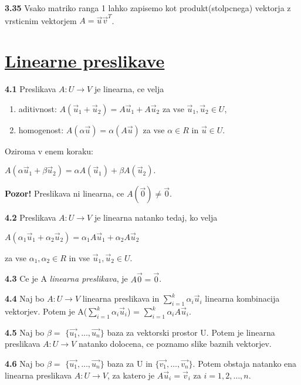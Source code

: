 \documentclass{article}
\begin{document}
\begin{multicols}{2}
	\textbf{3.35} Vsako matriko ranga 1 lahko zapisemo kot produkt(stolpcnega) vektorja z vrsticnim
	vektorjem $A = \vec{u}\vec{v}^{T}$.

	\section{\underline{Linearne preslikave}}

	\textbf{4.1} Preslikava $A: U \rightarrow V$ je linearna, ce velja
	\begin{enumerate}
		\item aditivnost: $A(\vec{u}_{1} + \vec{u}_{2}) = A\vec{u}_{1} + A\vec{u}_{2}$ za vse $\vec{u}_{1}, \vec{u}_{2} \in U$,
		\item homogenost: $A(\alpha \vec{u}) = \alpha(A\vec{u})$ za vse $\alpha \in R$ in $\vec{u} \in U$.
	\end{enumerate}
	Oziroma v enem koraku:
	\begin{center}
		\begin{math}
			A(\alpha\vec{u}_{1} + \beta\vec{u}_{2}) = \alpha A(\vec{u}_{1}) + \beta A(\vec{u}_{2}).
		\end{math}
	\end{center}
	\textbf{Pozor!} Preslikava ni linearna, ce $A(\vec{0}) \neq  \vec{0}$.

	\textbf{4.2} Preslikava $A: U \rightarrow V$ je linearna natanko tedaj, ko velja
	\begin{center}
		$A(\alpha_{1}\vec{u}_{1} + \alpha_{2}\vec{u}_{2}) = \alpha_{1}A\vec{u}_{1} + \alpha_{2}A\vec{u}_{2}$
	\end{center}
	za vse $\alpha_{1}, \alpha_{2} \in R$ in vse $\vec{u}_{1}, \vec{u}_{2} \in U$.

	\textbf{4.3} Ce je A \textit{linearna preslikava}, je $A\vec{0} = \vec{0}$.

	\textbf{4.4} Naj bo $A: U \rightarrow V$ linearna preslikava in $\sum_{i=1}^{k} \alpha_{i}\vec{u}_{i}$
	linearna kombinacija vektorjev. Potem je A($\sum_{i=1}^{k} \alpha_{i}\vec{u}_{i}$) = $\sum_{i=1}^{k} \alpha_{i}A\vec{u}_{i}$.

	\textbf{4.5} Naj bo $\beta =$ $\{ \vec{u_{1}}, \dots,\vec{u_{n}}\}$ baza za vektorski prostor U. Potem je linearna
	preslikava $A: U \rightarrow V$ natanko dolocena, ce poznamo slike baznih vektorjev.

	\textbf{4.6} Naj bo $\beta =$ $\{\vec{u_{1}}, \dots,\vec{u_{n}}\}$ baza za U in $\{\vec{v_{1}}, \dots,\vec{v_{n}}\}$.
	Potem obstaja natanko ena linearna preslikava $A: U \rightarrow V$, za katero je $A\vec{u}_{i} = \vec{v}_{i}$ za $i = 1, 2, \dots, n$.


\end{multicols}
\end{document}
